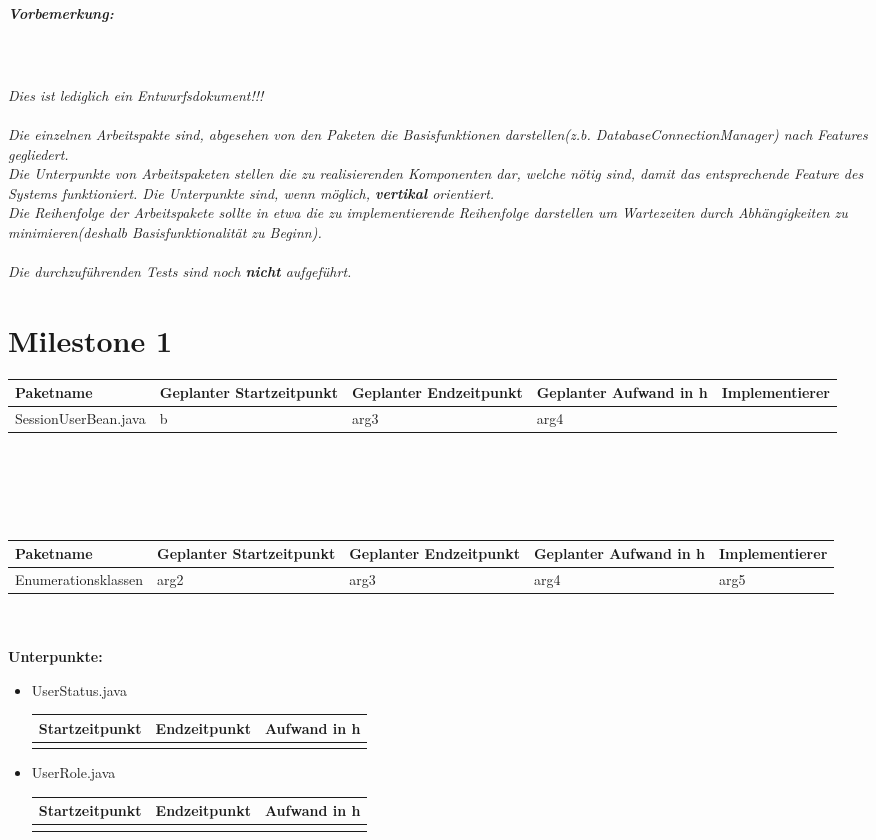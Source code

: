 \documentclass[12pt,a4paper]{scrreprt}
\newcommand{\Arbeitspaket}[5]{	\begin{tabular}{|p{4cm}|p{3cm}|p{3cm}|p{3cm}|p{3cm}|}
		\hline \textbf{Paketname} & \textbf{Geplanter Startzeitpunkt} & \textbf{Geplanter Endzeitpunkt} & \textbf{Geplanter Aufwand in h} & \textbf{Implementierer} \\ 
		\hline #1 & #2  & #3 & #4 & #5 \\ 
		\hline 
	\end{tabular} \ \\
	\ \\}
\begin{document}
	\paragraph{Vorbemerkung:}\ \\
	 \ \\
	{\it Dies ist lediglich ein Entwurfsdokument!!! \\ \\
		Die einzelnen Arbeitspakte sind, abgesehen von den Paketen die Basisfunktionen darstellen(z.b. DatabaseConnectionManager) nach Features gegliedert.\\
		Die Unterpunkte von Arbeitspaketen stellen die zu realisierenden Komponenten dar, welche nötig sind, damit das entsprechende Feature des Systems funktioniert. Die Unterpunkte sind, wenn möglich, \textbf{vertikal} orientiert.\ \\
		Die Reihenfolge der Arbeitspakete sollte in etwa die zu implementierende Reihenfolge darstellen um  Wartezeiten durch Abhängigkeiten zu minimieren(deshalb Basisfunktionalität zu Beginn).\ \\
		\ \\
		Die durchzuführenden Tests sind noch \textbf{nicht} aufgeführt. 
		 }
	\chapter*{Milestone 1}
	\Arbeitspaket{SessionUserBean.java}{b}{arg3}{arg4}{}
	
	
	\ \\
	\ \\
	\Arbeitspaket{Enumerationsklassen}{arg2}{arg3}{arg4}{arg5}
	\textbf{Unterpunkte:}
	\begin{itemize}
		\item UserStatus.java\\
			\begin{tabular}{|p{4cm}|p{4cm}|p{4cm}|}
				\hline Startzeitpunkt & Endzeitpunkt & Aufwand in h \\ 
				\hline &      &  \\ 
				\hline 
				\end{tabular}
		\item UserRole.java	\\
		\begin{tabular}{|p{4cm}|p{4cm}|p{4cm}|}
			\hline Startzeitpunkt & Endzeitpunkt & Aufwand in h \\ 
			\hline &      &  \\ 
			\hline 
		\end{tabular}
	\end{itemize}
	
\end{document}
